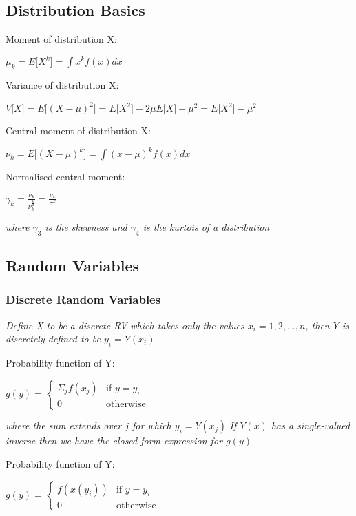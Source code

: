 \documentclass[12pt]{article}
\newcommand\textline[4][t]{%
  \par\smallskip\noindent\parbox[#1]{.35\textwidth}{\raggedright\texttt{}#2}%
  \parbox[#3]{.65\textwidth}{\raggedright\texttt{}#3}%
}
\begin{document}
\subsection*{Distribution Basics}
\textline[t]{Moment of distribution X:}{$\mu_k = E \lbrack X^k \rbrack = \int x^k f(x) dx$}
\newline
\textline[t]{Variance of distribution X:}{$V \lbrack X \rbrack = E \lbrack (X-\mu)^2\rbrack = E \lbrack X^2 \rbrack - 2 \mu E \lbrack X \rbrack + \mu^2 = E \lbrack X^2 \rbrack - \mu^2$}
\newline
\textline[t]{Central moment of distribution X:}{$\nu_k = E \lbrack (X-\mu)^k \rbrack = \int (x-\mu)^k f(x) dx$}
\newline
\textline[t]{Normalised central moment:}{$\gamma_k = \frac{\nu_k}{\nu^\frac{k}{2}_k} =\frac{\nu_k}{\sigma^k} $}
\newline
\newline
\textit{where $\gamma_3$ is  the skewness and $\gamma_4$ is the kurtois of a distribution}

\subsection*{Random Variables}

\subsubsection*{Discrete Random Variables}
\textit{Define X to be a discrete RV which takes only the values $x_i = 1, 2, ..., n$, then $Y$ is discretely defined to be $y_i = Y(x_i)$}
\textline[t]{Probability function of Y:}{$g(y) =
\begin{cases}
	\Sigma_j f(x_j) & \text{if } y = y_i \\
	0 & \text{otherwise}
\end{cases}$}
\newline
\newline
\textit{where the sum extends over $j$ for which $y_i = Y(x_j)$}
\newline
\newline
\textit{If $Y(x)$ has a single-valued inverse then we have the closed form expression for $g(y)$}
\textline[t]{Probability function of Y:}{$g(y) =
\begin{cases}
	f(x(y_i)) & \text{if } y = y_i \\
	0 & \text{otherwise}
\end{cases}$}
\newline
\newline
\end{document}

